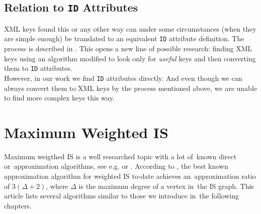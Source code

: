 \subsection{Relation to \texttt{ID} Attributes}

XML keys found this or any other way can under some circumstances (when they are simple enough) be translated to an equivalent \texttt{ID} attribute definition. The process is described in \cite[Ch.\ 9, s.\ 3]{vlist2002xml}. This opens a new line of possible research: finding XML keys using an algorithm modified to look only for \textit{useful} keys and then converting them to \texttt{ID} attributes.\\ 

However, in our work we find \texttt{ID} attributes directly. And even though we can always convert them to XML keys by the process mentioned above, we are unable to find more complex keys this way.\\

\section{Maximum Weighted IS}

Maximum weigthed IS is a well researched topic with a lot of~known direct or~approximation algorithms, see e.g. \cite{JM1986425} or \cite{Fomin:2009:MCA:1552285.1552286}. According to \cite{Paschos:1997:SAO:254180.254190}, the best known approximation algorithm for weighted IS to-date achieves an~approximation ratio of $3(\Delta + 2)$, where $\Delta$ is the maximum degree of a vertex in~the IS graph. This article lists several algorithms similar to those we introduce in~the following chapters.\\